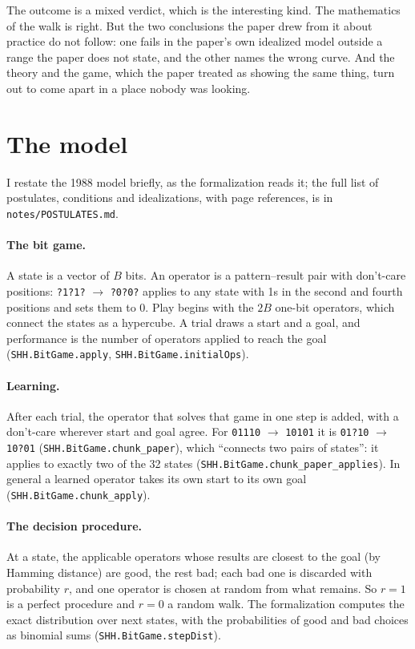 \documentclass[11pt]{article}
\newcommand{\lean}[1]{\texttt{#1}}
\newcommand{\code}[1]{\texttt{#1}}
\begin{document}
The outcome is a mixed verdict, which is the interesting kind. The
mathematics of the walk is right. But the two conclusions the paper drew
from it about practice do not follow: one fails in the paper's own
idealized model outside a range the paper does not state, and the other
names the wrong curve. And the theory
and the game, which the paper treated as showing the same thing, turn out
to come apart in a place nobody was looking.

\section{The model}
\label{sec:model}

I restate the 1988 model briefly, as the formalization reads it; the full
list of postulates, conditions and idealizations, with page references, is
in \code{notes/POSTULATES.md}.

\paragraph{The bit game.} A state is a vector of $B$ bits. An operator is a
pattern--result pair with don't-care positions: \code{?1?1?} $\to$
\code{?0?0?} applies to any state with 1s in the second and fourth
positions and sets them to 0. Play begins with the $2B$ one-bit operators,
which connect the states as a hypercube. A trial draws a start and a goal,
and performance is the number of operators applied to reach the goal
(\lean{SHH.BitGame.apply}, \lean{SHH.BitGame.initialOps}).

\paragraph{Learning.} After each trial, the operator that solves that game
in one step is added, with a don't-care wherever start and goal agree.
For \code{01110} $\to$ \code{10101} it is \code{01?10} $\to$ \code{10?01}
(\lean{SHH.BitGame.chunk\_paper}), which ``connects two pairs of states'':
it applies to exactly two of the 32 states
(\lean{SHH.BitGame.chunk\_paper\_applies}). In general a learned operator
takes its own start to its own goal (\lean{SHH.BitGame.chunk\_apply}).

\paragraph{The decision procedure.} At a state, the applicable operators
whose results are closest to the goal (by Hamming distance) are good, the
rest bad; each bad one is discarded with probability $r$, and one operator
is chosen at random from what remains. So $r = 1$ is a perfect procedure
and $r = 0$ a random walk. The formalization computes the exact
distribution over next states, with the probabilities of good and bad
choices as binomial sums (\lean{SHH.BitGame.stepDist}).
\end{document}
